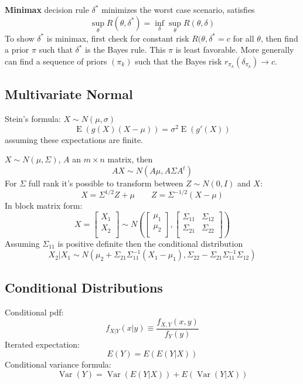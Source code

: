 \documentclass[10pt, twocolumn]{article}
\newcommand{\Expect}{\operatorname{E}}
\newcommand{\Var}{\operatorname{Var}}
\begin{document}
\textbf{Minimax} decision rule $\delta^*$ minimizes the worst case
scenario, satisfies
\[
    \sup_{\theta} R(\theta, \delta^*) = \inf_{\delta} \sup_{\theta}
    R(\theta, \delta)
\]
To show $\delta^*$ is minimax, first check for constant risk $R(\theta,
\delta^* = c$ for all $\theta$, then find a
prior $\pi$ such that $\delta^*$ is the Bayes rule. This $\pi$ is least
favorable. More generally can find
a sequence of priors $(\pi_k)$ such that the Bayes risk $r_{\pi_k}
(\delta_{\pi_k}) \rightarrow c$.

\newpage

\subsection*{Multivariate Normal}

Stein's formula: $X \sim N(\mu, \sigma)$
\[
    \Expect (g(X) (X - \mu)) = \sigma^2 \Expect(g'(X))
\]
assuming these expectations are finite.

$X \sim N(\mu, \Sigma)$, $A$ an $m \times n$ matrix,
then 
\[
    AX \sim N(A \mu, A \Sigma A^t)
\]
For $\Sigma$ full rank it's possible to transform between $Z \sim
N(0, I)$ and $X$:
\[
    X = \Sigma^{1/2} Z + \mu \qquad Z = \Sigma^{-1/2} (X - \mu)
\]
In block matrix form:
\[
    X =
    \begin{bmatrix}
        X_1 \\
        X_2 \\
    \end{bmatrix}
    \sim N \left(
    \begin{bmatrix}
        \mu_1 \\
        \mu_2 \\
    \end{bmatrix}
    ,
    \begin{bmatrix}
        \Sigma_{11} & \Sigma_{12} \\
        \Sigma_{21} & \Sigma_{22} \\
    \end{bmatrix}
\right)
\]
Assuming $\Sigma_{11}$ is positive definite then the conditional
distribution
\[
    X_2 | X_1 \sim N(\mu_2 + \Sigma_{21} \Sigma_{11}^{-1} (X_1 - \mu_1),
    \Sigma_{22} - \Sigma_{21} \Sigma_{11}^{-1} \Sigma_{12})
\]

\subsection*{Conditional Distributions}

Conditional pdf:
\[
    f_{X|Y}(x | y) \equiv \frac{f_{X, Y}(x, y)}{f_Y(y)}
\]
Iterated expectation:
\[
    E(Y) = E(E(Y | X))
\]
Conditional variance formula:
\[
    \Var(Y) = \Var(E(Y | X)) + E(\Var(Y | X))
\]
\end{document}
